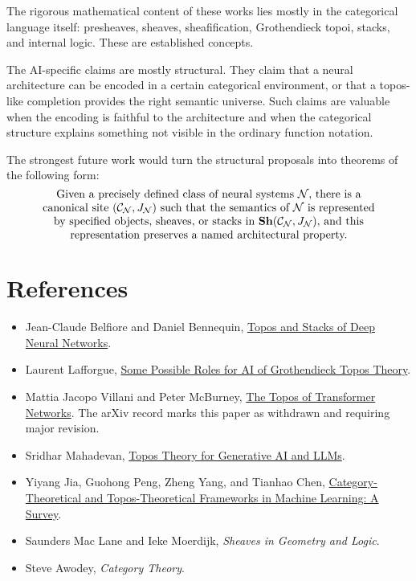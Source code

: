 \documentclass[11pt]{article}
\newcommand{\Sh}{\mathbf{Sh}}
\begin{document}
The rigorous mathematical content of these works lies mostly in the categorical
language itself: presheaves, sheaves, sheafification, Grothendieck topoi,
stacks, and internal logic. These are established concepts.

The AI-specific claims are mostly structural. They claim that a neural
architecture can be encoded in a certain categorical environment, or that a
topos-like completion provides the right semantic universe. Such claims are
valuable when the encoding is faithful to the architecture and when the
categorical structure explains something not visible in the ordinary function
notation.

The strongest future work would turn the structural proposals into theorems of
the following form:
\[
\parbox{0.86\textwidth}{\centering
Given a precisely defined class of neural systems \(\mathcal N\), there is a
canonical site \((\mathcal C_{\mathcal N},J_{\mathcal N})\) such that the
semantics of \(\mathcal N\) is represented by specified objects, sheaves, or
stacks in \(\Sh(\mathcal C_{\mathcal N},J_{\mathcal N})\), and this
representation preserves a named architectural property.}
\]

\section{References}

\begin{itemize}
\item Jean-Claude Belfiore and Daniel Bennequin,
\href{https://arxiv.org/abs/2106.14587}{Topos and Stacks of Deep Neural Networks}.
\item Laurent Lafforgue,
\href{https://www.laurentlafforgue.org/Expose_Lafforgue_topos_AI_ETH_sept_2022.pdf}{Some Possible Roles for AI of Grothendieck Topos Theory}.
\item Mattia Jacopo Villani and Peter McBurney,
\href{https://arxiv.org/abs/2403.18415}{The Topos of Transformer Networks}.
The arXiv record marks this paper as withdrawn and requiring major revision.
\item Sridhar Mahadevan,
\href{https://arxiv.org/abs/2508.08293}{Topos Theory for Generative AI and LLMs}.
\item Yiyang Jia, Guohong Peng, Zheng Yang, and Tianhao Chen,
\href{https://arxiv.org/abs/2408.14014}{Category-Theoretical and Topos-Theoretical Frameworks in Machine Learning: A Survey}.
\item Saunders Mac Lane and Ieke Moerdijk, \emph{Sheaves in Geometry and Logic}.
\item Steve Awodey, \emph{Category Theory}.
\end{itemize}
\end{document}
